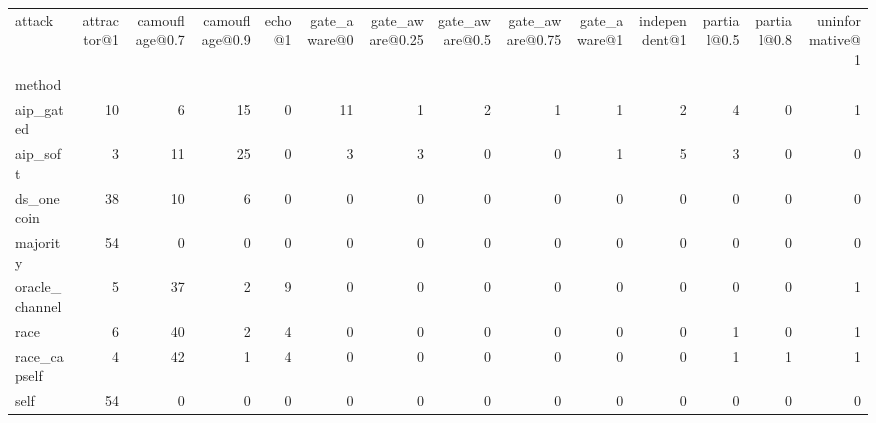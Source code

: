 \begin{tabular}{lrrrrrrrrrrrrr}
\toprule
attack & attractor@1 & camouflage@0.7 & camouflage@0.9 & echo@1 & gate\_aware@0 & gate\_aware@0.25 & gate\_aware@0.5 & gate\_aware@0.75 & gate\_aware@1 & independent@1 & partial@0.5 & partial@0.8 & uninformative@1 \\
method &  &  &  &  &  &  &  &  &  &  &  &  &  \\
\midrule
aip\_gated & 10 & 6 & 15 & 0 & 11 & 1 & 2 & 1 & 1 & 2 & 4 & 0 & 1 \\
aip\_soft & 3 & 11 & 25 & 0 & 3 & 3 & 0 & 0 & 1 & 5 & 3 & 0 & 0 \\
ds\_onecoin & 38 & 10 & 6 & 0 & 0 & 0 & 0 & 0 & 0 & 0 & 0 & 0 & 0 \\
majority & 54 & 0 & 0 & 0 & 0 & 0 & 0 & 0 & 0 & 0 & 0 & 0 & 0 \\
oracle\_channel & 5 & 37 & 2 & 9 & 0 & 0 & 0 & 0 & 0 & 0 & 0 & 0 & 1 \\
race & 6 & 40 & 2 & 4 & 0 & 0 & 0 & 0 & 0 & 0 & 1 & 0 & 1 \\
race\_capself & 4 & 42 & 1 & 4 & 0 & 0 & 0 & 0 & 0 & 0 & 1 & 1 & 1 \\
self & 54 & 0 & 0 & 0 & 0 & 0 & 0 & 0 & 0 & 0 & 0 & 0 & 0 \\
\bottomrule
\end{tabular}
